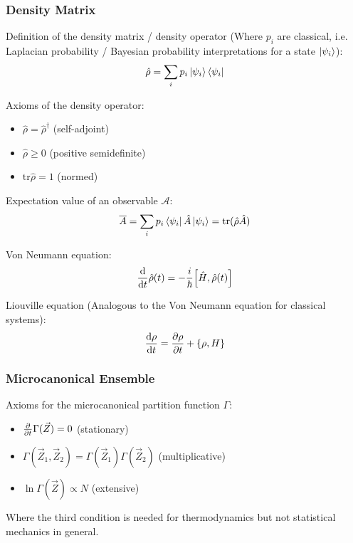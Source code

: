 		\subsubsection{Density Matrix}
			\noindent
			Definition of the density matrix / density operator (Where $p_i$ are classical, i.e. Laplacian probability / Bayesian probability interpretations for a state $\Ket{\psi_i}$):
			\begin{equation}
				\hat{\rho} = \sum_i p_i \Ket{\psi_i}\Bra{\psi_i}
			\end{equation}

			\noindent
			Axioms of the density operator:%
			\begin{itemize}\itemsep -0pt	%
				\item $\hat{\rho} = \hat{\rho}^\dagger$ \hfill{(self-adjoint)}
				\item $\hat{\rho} \ge 0 $ \hfill{(positive semidefinite)}
				\item $\mathrm{tr} \hat{\rho} = 1$ \hfill{(normed)}
			\end{itemize}

			\noindent
			Expectation value of an observable $\mathcal{A}$:
			\begin{equation}
				\overline{A} = \sum_i p_i \Bra{\psi_i}\hat{A}\Ket{\psi_i} = \mathrm{tr} (\hat{\rho}\hat{A})
			\end{equation}

			\noindent
			Von Neumann equation:
			\begin{equation}
				\tder{}{t}\hat{\rho}(t) = -\frac{i}{\hbar} \comm{\hat{H}}{\hat{\rho}(t)}
			\end{equation}

			\noindent
			Liouville equation (Analogous to the Von Neumann equation for classical systems):
			\begin{equation}
				\frac{\dd \rho}{\dd t} = \frac{\partial \rho}{\partial t}+\left\lbrace \rho,H \right\rbrace
			\end{equation}

		\subsubsection{Microcanonical Ensemble}
			\noindent
			Axioms for the microcanonical partition function $\Gamma$:
			\begin{itemize}\itemsep -0pt	%
				\item $\frac{\partial }{\partial t}\Gamma(\vec{Z}) = 0$ \hfill{(stationary)}
				\item $\Gamma(\vec{Z}_1,\vec{Z}_2) = \Gamma(\vec{Z}_1)\Gamma(\vec{Z}_2) $ \hfill{(multiplicative)}
				\item $\ln\Gamma(\vec{Z}) \propto N$ \hfill{(extensive)}
			\end{itemize}
			Where the third condition is needed for thermodynamics but not statistical mechanics in general.

